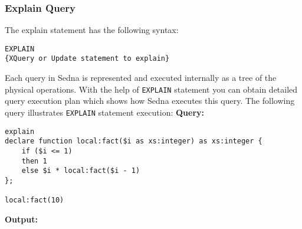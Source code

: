 \documentclass[a4paper,12pt]{article}
\begin{document}
\subsubsection{Explain Query}
The explain statement has the following syntax:
\begin{verbatim}
EXPLAIN
{XQuery or Update statement to explain}
\end{verbatim}
Each query in Sedna is represented and executed internally as a tree of the physical operations. With the help of \verb!EXPLAIN! statement you
can obtain detailed query execution plan which shows how Sedna executes this query. 
\newline
\newline
The following query illustrates \verb!EXPLAIN! statement execution:
\newline
\newline
\textbf{Query:}
\begin{verbatim}
explain
declare function local:fact($i as xs:integer) as xs:integer {
    if ($i <= 1)
    then 1
    else $i * local:fact($i - 1)
};

local:fact(10)
\end{verbatim}
\textbf{Output:}
\end{document}
